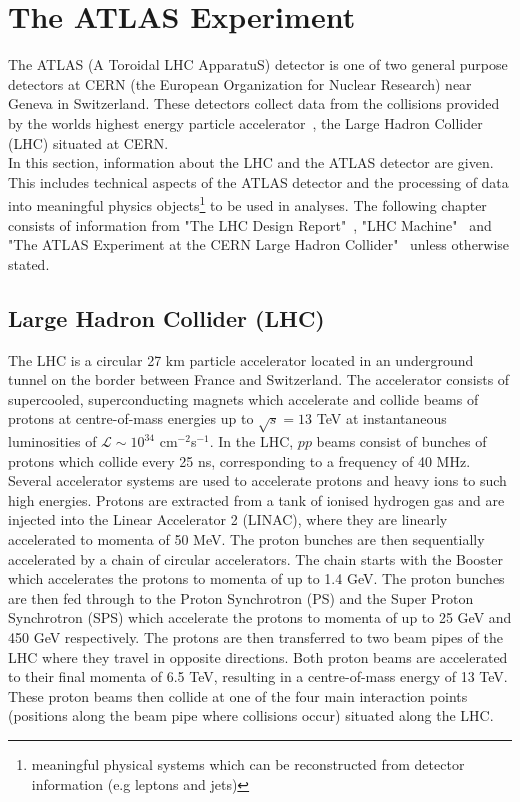 \section{The ATLAS Experiment}
The ATLAS (A Toroidal LHC ApparatuS) detector is one of two general purpose detectors at CERN (the European Organization for Nuclear Research) near Geneva in Switzerland. These detectors collect data from the collisions provided by the worlds highest energy particle accelerator~\cite{lhc-design-report}, the Large Hadron Collider (LHC) situated at CERN. \\

In this section, information about the LHC and the ATLAS detector are given. This includes technical aspects of the ATLAS detector and the processing of data into meaningful physics objects\footnote{meaningful physical systems which can be reconstructed from detector information (e.g leptons and jets)} to be used in analyses. The following chapter consists of information from "The LHC Design Report"~\cite{lhc-design-report}, "LHC Machine"~\cite{Evans_2008} and "The ATLAS Experiment at the CERN Large Hadron Collider"~\cite{Collaboration_2008} unless otherwise stated.

\subsection{Large Hadron Collider (LHC)}
The LHC is a circular 27 km particle accelerator located in an underground tunnel on the border between France and Switzerland. The accelerator consists of supercooled, superconducting magnets which accelerate and collide beams of protons at centre-of-mass energies up to $\sqrt{s} = 13$ TeV at instantaneous luminosities of $\mathcal{L} \sim 10^{34}$ cm$^{-2}$s$^{-1}$. In the LHC, $pp$ beams consist of bunches of protons which collide every 25 ns, corresponding to a frequency of 40 MHz. Several accelerator systems are used to accelerate protons and heavy ions to such high energies. Protons are extracted from a tank of ionised hydrogen gas and are injected into the Linear Accelerator 2 (LINAC), where they are linearly accelerated to momenta of 50 MeV. The proton bunches are then sequentially accelerated by a chain of circular accelerators. The chain starts with the Booster which accelerates the protons to momenta of up to 1.4 GeV. The proton bunches are then fed through to the Proton Synchrotron (PS) and the Super Proton Synchrotron (SPS) which accelerate the protons to momenta of up to 25 GeV and 450 GeV respectively. The protons are then transferred to two beam pipes of the LHC where they travel in opposite directions. Both proton beams are accelerated to their final momenta of 6.5 TeV, resulting in a centre-of-mass energy of 13 TeV. These proton beams then collide at one of the four main interaction points (positions along the beam pipe where collisions occur) situated along the LHC. \\

